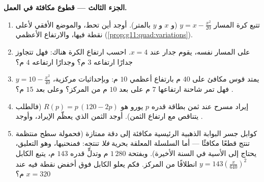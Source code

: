 \begin{problem}
\medskip
\noindent\textbf{الجزء الثالث --- قطوع مكافئة في العمل.}
\begin{enumerate}[resume]
  \item تتبع كرة المسار
        $y = x - \frac{x^2}{20}$ (و $x$ و $y$ بالمتر). أوجد
        أين تحط، والموضع الأفقي لأعلى
        نقطة فيها، والارتفاع الأعظمي
        (\cref{prop:g11:quad:variations}).
  \item على المسار نفسه، يقوم جدار عند $x = 4$.
        احسب ارتفاع الكرة هناك: فهل تتجاوز جدارًا ارتفاعه $3$ م؟
        وجدارًا ارتفاعه $4$ م؟
  \item يمتد قوس مكافئ على $40$ م بارتفاع أعظمي
        $10$ م: وبإحداثيات مركزية،
        $y = 10 - \frac{x^2}{40}$. فهل تمر شاحنة ارتفاعها $7$ م
        على بعد $10$ م من المركز؟ وعلى بعد $15$ م؟
  \item إيراد مسرح عند ثمن بطاقة قدره $p$ يورو هو
        $R(p) = p\,(120 - 2p)$ (فالطلب يتناقص مع ارتفاع الثمن).
        أوجد الثمن الذي يعظّم الإيراد، وأوجد .
  \item كوابل جسر البوابة الذهبية الرئيسية مكافئة إلى
        دقة ممتازة (فحمولة سطح منتظمة تنتج
        قطعًا مكافئًا --- أما السلسلة المعلقة بحرية \emph{فلا} تنتجه:
        فمنحنيها، وهو  التعليق، يحتاج إلى  الأسية في السنة الأخيرة).
        وبفتحة $1\,280$ م وتدلٍّ قدره $143$ م، يتبع الكابل
        $y = 143\left(\frac{x}{640}\right)^2$ انطلاقًا من المركز.
        فكم يعلو الكابل فوق أخفض نقطة فيه عند
        $x = 320$ م؟
\end{enumerate}


\end{problem}

